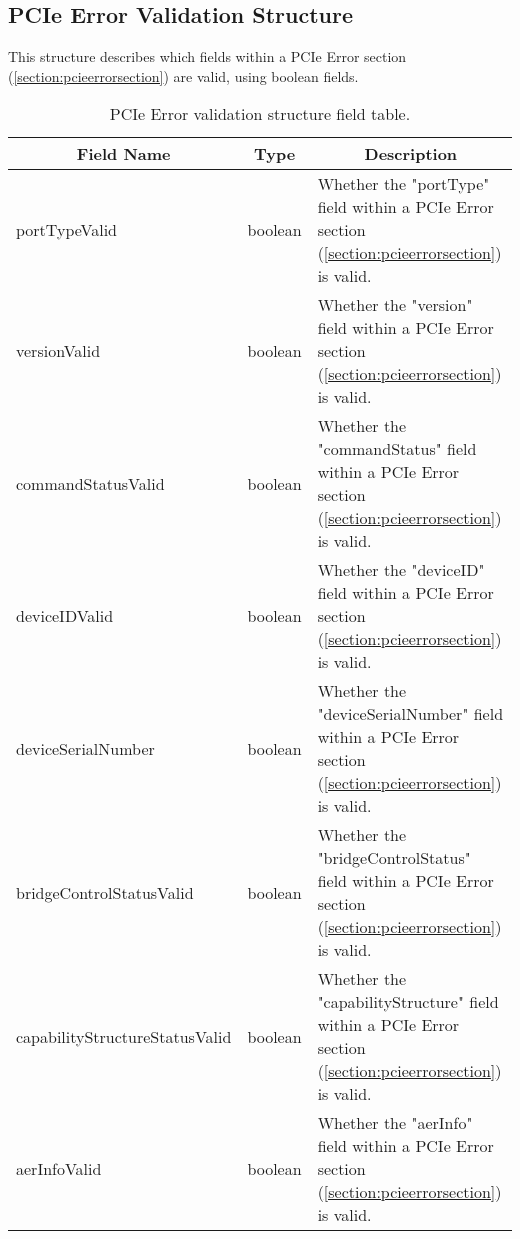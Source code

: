 \documentclass{report}
\newcommand*{\thead}[1]{\multicolumn{1}{|c|}{\bfseries #1}}
\newcommand*{\jsontable}[1]{
    \begin{table}[!ht]
    \label{#1}
    \centering
    \begin{adjustbox}{center}
    \begin{tabular}{|l|c|p{8cm}|}
    \hline
    \thead{Field Name} & \thead{Type} & \thead{Description} \\
    \hline
}
\newcommand*{\jsontableend}[1]{
    \hline
    \end{tabular}
    \end{adjustbox}
    \caption{#1}
    \label{table:#1}
    \end{table}
    \FloatBarrier
}
\begin{document}
\subsection{PCIe Error Validation Structure}
\label{subsection:pcieerrorvalidationstructure}
This structure describes which fields within a PCIe Error section (\ref{section:pcieerrorsection}) are valid, using boolean fields.
\jsontable{table:pcieerrorvalidationstructure}
portTypeValid & boolean & Whether the "portType" field within a PCIe Error section (\ref{section:pcieerrorsection}) is valid.\\
\hline
versionValid & boolean & Whether the "version" field within a PCIe Error section (\ref{section:pcieerrorsection}) is valid.\\
\hline
commandStatusValid & boolean & Whether the "commandStatus" field within a PCIe Error section (\ref{section:pcieerrorsection}) is valid.\\
\hline
deviceIDValid & boolean & Whether the "deviceID" field within a PCIe Error section (\ref{section:pcieerrorsection}) is valid.\\
\hline
deviceSerialNumber & boolean & Whether the "deviceSerialNumber" field within a PCIe Error section (\ref{section:pcieerrorsection}) is valid.\\
\hline
bridgeControlStatusValid & boolean & Whether the "bridgeControlStatus" field within a PCIe Error section (\ref{section:pcieerrorsection}) is valid.\\
\hline
capabilityStructureStatusValid & boolean & Whether the "capabilityStructure" field within a PCIe Error section (\ref{section:pcieerrorsection}) is valid.\\
\hline
aerInfoValid & boolean & Whether the "aerInfo" field within a PCIe Error section (\ref{section:pcieerrorsection}) is valid.\\
\hline
\jsontableend{PCIe Error validation structure field table.}

\end{document}
